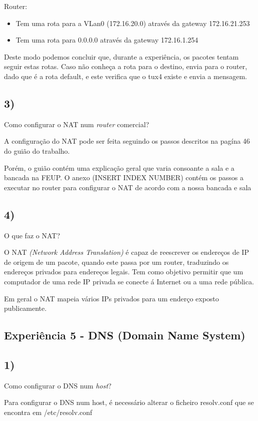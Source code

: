 \documentclass[11pt]{article}
\begin{document}
Router:
\begin{itemize}
\item Tem uma rota para a VLan0 (172.16.20.0) através da gateway 172.16.21.253
\item Tem uma rota para 0.0.0.0 através da gateway 172.16.1.254
\end{itemize}

Deste modo podemos concluir que, durante a experiência, os pacotes tentam seguir estas rotas. Caso não conheça a rota para o destino, envia para o router, dado que é a rota default, e este verifica que o tux4 existe e envia a mensagem. 
	

\subsection{3)} Como configurar o NAT num \emph{router} comercial?

A configuração do NAT pode ser feita seguindo os passos descritos na pagína 46 do guião do trabalho.

Porém, o guião contém uma explicação geral que varia consoante a sala e a bancada na FEUP. O anexo (INSERT INDEX NUMBER) contém os passos a executar no router para configurar o NAT de acordo com a nossa bancada e sala

\subsection{4)} O que faz o NAT?

O NAT \emph{(Network Address Translation)} é capaz de reescrever os endereços de IP de origem de um pacote, quando este passa por um router, traduzindo os endereços privados para endereços legais. Tem como objetivo permitir que um computador de uma rede IP privada se conecte á Internet ou a uma rede pública.

Em geral o NAT mapeia vários IPs privados para um enderço exposto publicamente.

\subsection{Experiência 5 - DNS (Domain Name System)}

\subsection{1)} Como configurar o DNS num \emph{host}?

Para configurar o DNS num host, é necessário alterar o ficheiro resolv.conf que se encontra em /etc/resolv.conf
\end{document}
